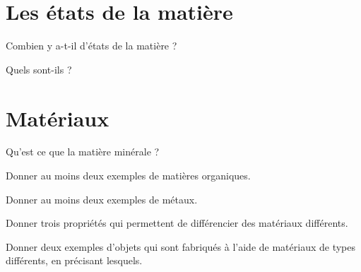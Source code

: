 
\section{Les états de la matière}

\begin{questions}
	\question Combien y a-t-il d'états de la matière ?
	\fillwithdottedlines{1cm}
	
	\question Quels sont-ils ?
	\fillwithdottedlines{2cm}
\end{questions}



\section{Matériaux}

\begin{questions}
	\question Qu'est ce que la matière minérale ?
	\fillwithdottedlines{2cm}
	
	\question Donner au moins deux exemples de matières organiques.
	\fillwithdottedlines{1.5cm}
	
	\question Donner au moins deux exemples de métaux.
	\fillwithdottedlines{1.5cm}
	
	
	\question Donner trois propriétés qui permettent de différencier des matériaux différents.
	\fillwithdottedlines{2cm}
	
	
	\question Donner deux exemples d'objets qui sont fabriqués à l'aide de matériaux de types différents, en précisant lesquels.
	\fillwithdottedlines{4cm}
\end{questions}